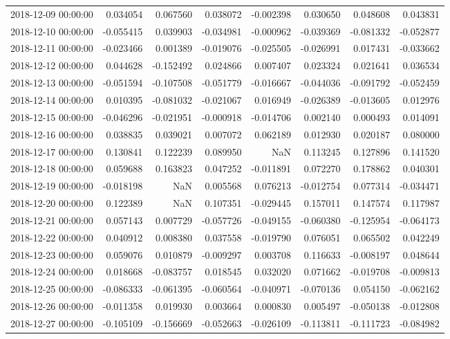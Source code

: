 \begin{tabular}{lrrrrrrr}
2018-12-09 00:00:00 & 0.034054 & 0.067560 & 0.038072 & -0.002398 & 0.030650 & 0.048608 & 0.043831 \\
2018-12-10 00:00:00 & -0.055415 & 0.039903 & -0.034981 & -0.000962 & -0.039369 & -0.081332 & -0.052877 \\
2018-12-11 00:00:00 & -0.023466 & 0.001389 & -0.019076 & -0.025505 & -0.026991 & 0.017431 & -0.033662 \\
2018-12-12 00:00:00 & 0.044628 & -0.152492 & 0.024866 & 0.007407 & 0.023324 & 0.021641 & 0.036534 \\
2018-12-13 00:00:00 & -0.051594 & -0.107508 & -0.051779 & -0.016667 & -0.044036 & -0.091792 & -0.052459 \\
2018-12-14 00:00:00 & 0.010395 & -0.081032 & -0.021067 & 0.016949 & -0.026389 & -0.013605 & 0.012976 \\
2018-12-15 00:00:00 & -0.046296 & -0.021951 & -0.000918 & -0.014706 & 0.002140 & 0.000493 & 0.014091 \\
2018-12-16 00:00:00 & 0.038835 & 0.039021 & 0.007072 & 0.062189 & 0.012930 & 0.020187 & 0.080000 \\
2018-12-17 00:00:00 & 0.130841 & 0.122239 & 0.089950 & NaN & 0.113245 & 0.127896 & 0.141520 \\
2018-12-18 00:00:00 & 0.059688 & 0.163823 & 0.047252 & -0.011891 & 0.072270 & 0.178862 & 0.040301 \\
2018-12-19 00:00:00 & -0.018198 & NaN & 0.005568 & 0.076213 & -0.012754 & 0.077314 & -0.034471 \\
2018-12-20 00:00:00 & 0.122389 & NaN & 0.107351 & -0.029445 & 0.157011 & 0.147574 & 0.117987 \\
2018-12-21 00:00:00 & 0.057143 & 0.007729 & -0.057726 & -0.049155 & -0.060380 & -0.125954 & -0.064173 \\
2018-12-22 00:00:00 & 0.040912 & 0.008380 & 0.037558 & -0.019790 & 0.076051 & 0.065502 & 0.042249 \\
2018-12-23 00:00:00 & 0.059076 & 0.010879 & -0.009297 & 0.003708 & 0.116633 & -0.008197 & 0.048644 \\
2018-12-24 00:00:00 & 0.018668 & -0.083757 & 0.018545 & 0.032020 & 0.071662 & -0.019708 & -0.009813 \\
2018-12-25 00:00:00 & -0.086333 & -0.061395 & -0.060564 & -0.040971 & -0.070136 & 0.054150 & -0.062162 \\
2018-12-26 00:00:00 & -0.011358 & 0.019930 & 0.003664 & 0.000830 & 0.005497 & -0.050138 & -0.012808 \\
2018-12-27 00:00:00 & -0.105109 & -0.156669 & -0.052663 & -0.026109 & -0.113811 & -0.111723 & -0.084982 \\

\end{tabular}
